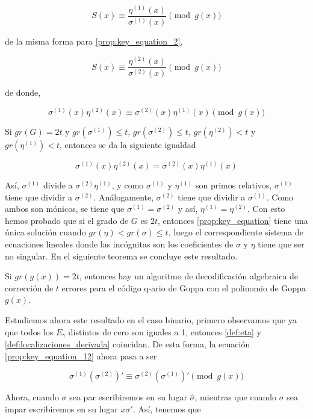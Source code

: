 $$S(x) \equiv \frac{\eta^{(1)}(x)}{\sigma^{(1)}(x)} \pmod{g(x)}$$

de la misma forma para \ref{prop:key_equation_2},

$$S(x) \equiv \frac{\eta^{(2)}(x)}{\sigma^{(2)}(x)} \pmod{g(x)}$$

de donde,

\begin{equation}
    \label{prop:key_equation_12}
    \sigma^{(1)}(x) \eta^{(2)}(x) \equiv \sigma^{(2)}(x) \eta^{(1)}(x) \pmod{g(x)}
\end{equation}

Si $gr(G) = 2t$ y $gr(\sigma^{(1)}) \leq t$, $gr(\sigma^{(2)}) \leq t$, $gr(\eta^{(2)}) < t$ y $gr(\eta^{(1)}) < t$, entonces se da la siguiente igualdad

\begin{equation}
    \label{prop:key_equation_caso1}
    \sigma^{(1)}(x) \eta^{(2)}(x) = \sigma^{(2)}(x) \eta^{(1)}(x)
\end{equation}

Así, $\sigma^{(1)}$ divide a $\sigma^{(2)} \eta^{(1)}$, y como $\sigma^{(1)}$ y $\eta^{(1)}$ son primos relativos, $\sigma^{(1)}$ tiene que dividir a $\sigma^{(2)}$. Análogamente, $\sigma^{(2)}$ tiene que dividir a $\sigma^{(1)}$. Como ambos son mónicos, se tiene que $\sigma^{(1)} = \sigma^{(2)}$ y así, $\eta^{(1)} = \eta^{(2)}$. Con esto hemos probado que si el grado de $G$ es $2t$, entonces \ref{prop:key_equation} tiene una única solución cuando $gr(\eta) < gr(\sigma) \leq t$, luego el correspondiente sistema de ecuaciones lineales donde las incógnitas son los coeficientes de $\sigma$ y $\eta$ tiene que ser no singular. En el siguiente teorema se concluye este resultado.

\begin{theorem}
    Si $gr(g(x)) = 2t$, entonces hay un algoritmo de decodificación algebraica de corrección de $t$ errores para el código q-ario de Goppa con el polinomio de Goppa $g(x)$.
\end{theorem}

Estudiemos ahora este resultado en el caso binario, primero observamos que ya que todos los $E_\gamma$ distintos de cero son iguales a 1, entonces \ref{def:eta} y \ref{def:localizaciones_derivada} coincidan. De esta forma, la ecuación \ref{prop:key_equation_12} ahora pasa a ser

$$\sigma^{(1)} \left( \sigma^{(2)} \right) ' \equiv \sigma^{(2)} \left( \sigma^{(1)} \right) ' \pmod{g(x)}$$

Ahora, cuando $\sigma$ sea par escribiremos en su lugar $\hat{\sigma}$, mientras que cuando $\sigma$ sea impar escribiremos en su lugar $x \sigma '$. Así, tenemos que

